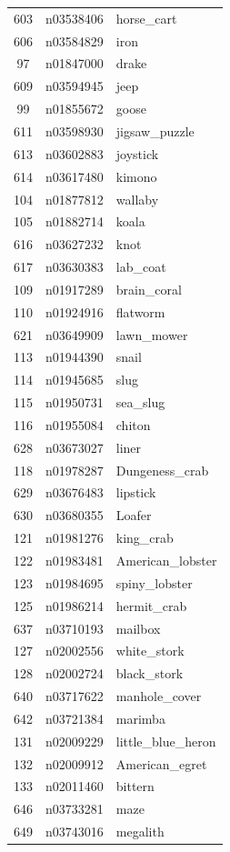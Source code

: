 \begin{table}
\begin{tabular}{cll}
603 & n03538406 & horse_cart \\
606 & n03584829 & iron \\
97 & n01847000 & drake \\
609 & n03594945 & jeep \\
99 & n01855672 & goose \\
611 & n03598930 & jigsaw_puzzle \\
613 & n03602883 & joystick \\
614 & n03617480 & kimono \\
104 & n01877812 & wallaby \\
105 & n01882714 & koala \\
616 & n03627232 & knot \\
617 & n03630383 & lab_coat \\
109 & n01917289 & brain_coral \\
110 & n01924916 & flatworm \\
621 & n03649909 & lawn_mower \\
113 & n01944390 & snail \\
114 & n01945685 & slug \\
115 & n01950731 & sea_slug \\
116 & n01955084 & chiton \\
628 & n03673027 & liner \\
118 & n01978287 & Dungeness_crab \\
629 & n03676483 & lipstick \\
630 & n03680355 & Loafer \\
121 & n01981276 & king_crab \\
122 & n01983481 & American_lobster \\
123 & n01984695 & spiny_lobster \\
125 & n01986214 & hermit_crab \\
637 & n03710193 & mailbox \\
127 & n02002556 & white_stork \\
128 & n02002724 & black_stork \\
640 & n03717622 & manhole_cover \\
642 & n03721384 & marimba \\
131 & n02009229 & little_blue_heron \\
132 & n02009912 & American_egret \\
133 & n02011460 & bittern \\
646 & n03733281 & maze \\
649 & n03743016 & megalith \\

\end{tabular}
\end{table}
